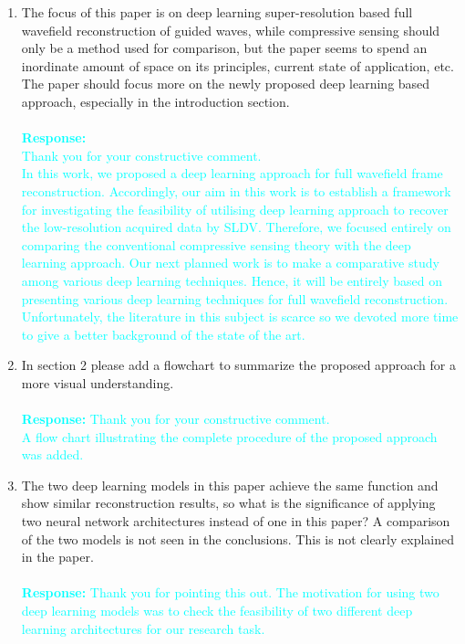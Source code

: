 \documentclass[11pt,a2paper]{report}
\begin{document}
	\begin{enumerate}
		\item The focus of this paper is on deep learning super-resolution based full wavefield reconstruction of guided waves, while compressive sensing should only be a method used for comparison, but the paper seems to spend an inordinate amount of space on its principles, current state of application, etc. 
		The paper should focus more on the newly proposed deep learning based approach, especially in the introduction section.
		\\ \\ 
		\textcolor{Cyan}
		{
			\textbf{Response:}\\
			Thank you for your constructive comment. \\
			In this work, we proposed a deep learning approach for full wavefield frame reconstruction.
			Accordingly, our aim in this work is to establish a framework for investigating the feasibility of utilising deep learning approach to recover the low-resolution acquired data by SLDV.			
			Therefore, we focused entirely on comparing the conventional compressive sensing theory with the deep learning approach.
			Our next planned work is to make a comparative study among various deep learning techniques.
			Hence, it will be entirely based on presenting various deep learning techniques for full wavefield reconstruction.
			Unfortunately, the literature in this subject is scarce so we devoted more time to give a better background of the state of the art.
		}
		\item  In section 2 please add a flowchart to summarize the proposed approach for a more visual understanding.
		\\ \\ 
		\textcolor{Cyan}
		{
			\textbf{Response:}
			Thank you for your constructive comment. \\
			A flow chart illustrating the complete procedure of the proposed approach was added.
		}
		\item The two deep learning models in this paper achieve the same function and show similar reconstruction results, so what is the significance of applying two neural network architectures instead of one in this paper? A comparison of the two models is not seen in the conclusions. 
		This is not clearly explained in the paper. 
		\\ \\ 
		\textcolor{Cyan}
		{
			\textbf{Response:}
			Thank you for pointing this out. 
			The motivation for using two deep learning models was to check the feasibility of two different deep learning architectures for our research task. 
}
\end{enumerate}
\end{document}
